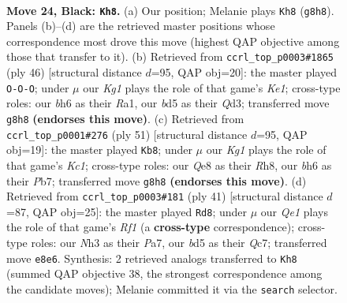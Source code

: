 \documentclass[11pt]{article}
\begin{document}
\clearpage

\begin{figure}[p]\centering
\begin{subfigure}{0.46\textwidth}\centering
\resizebox{\linewidth}{!}{%
\newchessgame
\chessboard[
  setfen={r1b1q1k1/ppb4p/5ppB/3B4/7P/3P1NPn/PPP2PK1/R2Q4 b - - 0 24},
  showmover=false,
  pgfstyle=straightmove, color=movearrow, markmove={g8-h8}
]}
\caption{}
\end{subfigure}\hfill
\begin{subfigure}{0.46\textwidth}\centering
\resizebox{\linewidth}{!}{%
\newchessgame
\chessboard[
  setfen={r2n4/pbpkqp2/3p4/2P1p1p1/8/2PQP1B1/P2N1PP1/R3K3 w Q - 0 24},
  showmover=false,
  pgfstyle=straightmove, color=movearrow, markmove={e1-c1}
]}
\caption{}
\end{subfigure}
\\[4pt]
\begin{subfigure}{0.46\textwidth}\centering
\resizebox{\linewidth}{!}{%
\newchessgame
\chessboard[
  setfen={2k4r/1p1nqpp1/2p5/B3b2p/P3P3/2P3PB/1P3Q1P/4R2K b - - 4 26},
  showmover=false,
  pgfstyle=straightmove, color=movearrow, markmove={c8-b8}
]}
\caption{}
\end{subfigure}\hfill
\begin{subfigure}{0.46\textwidth}\centering
\resizebox{\linewidth}{!}{%
\newchessgame
\chessboard[
  setfen={5r1k/p1qbbpp1/4p2p/n1P5/8/3BBN2/P1Q2PPP/1R4K1 b - - 0 21},
  showmover=false,
  pgfstyle=straightmove, color=movearrow, markmove={f8-d8}
]}
\caption{}
\end{subfigure}
\caption{\textbf{Move 24, Black: \texttt{Kh8}.} (a) Our position; Melanie plays \texttt{Kh8} (\texttt{g8h8}). Panels (b)--(d) are the retrieved master positions whose correspondence most drove this move (highest QAP objective among those that transfer to it). (b) Retrieved from \texttt{ccrl\_top\_p0003\#1865} (ply 46) [structural distance $d$=95, QAP obj=20]: the master played \texttt{O-O-O}; under $\mu$ our \emph{Kg1} plays the role of that game's \emph{Ke1}; cross-type roles: our \emph{b}h6 as their \emph{R}a1, our \emph{b}d5 as their \emph{Q}d3; transferred move \texttt{g8h8} \textbf{(endorses this move)}. (c) Retrieved from \texttt{ccrl\_top\_p0001\#276} (ply 51) [structural distance $d$=95, QAP obj=19]: the master played \texttt{Kb8}; under $\mu$ our \emph{Kg1} plays the role of that game's \emph{Kc1}; cross-type roles: our \emph{Q}e8 as their \emph{R}h8, our \emph{b}h6 as their \emph{P}b7; transferred move \texttt{g8h8} \textbf{(endorses this move)}. (d) Retrieved from \texttt{ccrl\_top\_p0003\#181} (ply 41) [structural distance $d$=87, QAP obj=25]: the master played \texttt{Rd8}; under $\mu$ our \emph{Qe1} plays the role of that game's \emph{Rf1} (a \textbf{cross-type} correspondence); cross-type roles: our \emph{N}h3 as their \emph{P}a7, our \emph{b}d5 as their \emph{Q}c7; transferred move \texttt{e8e6}. Synthesis: 2 retrieved analogs transferred to \texttt{Kh8} (summed QAP objective 38, the strongest correspondence among the candidate moves); Melanie committed it via the \texttt{search} selector.}
\label{fig:thought-m47}
\end{figure}
\end{document}
